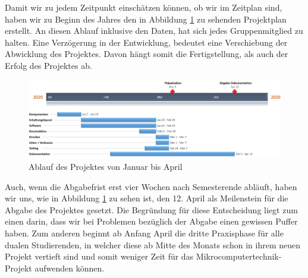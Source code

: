 \label{Arbeitsplan}


Damit wir zu jedem Zeitpunkt einschätzen können, ob wir im Zeitplan sind, haben wir zu Beginn des Jahres den in Abbildung \ref{fig:Ablaufplan} zu sehenden Projektplan erstellt. An diesen Ablauf inklusive den Daten, hat sich jedes Gruppenmitglied zu halten. Eine Verzögerung in der Entwicklung, bedeutet eine Verschiebung der Abwicklung des Projektes. Davon hängt somit die Fertigstellung, als auch der Erfolg des Projektes ab. \\

\begin{figure}[!hbt]
	\centering
	\includegraphics[width=1\linewidth]{Images/Ablaufplan}
	\caption{Ablauf des Projektes von Januar bis April}
	\label{fig:Ablaufplan}
\end{figure}

Auch, wenn die Abgabefrist erst vier Wochen nach Semesterende abläuft, haben wir uns, wie in Abbildung \ref{fig:Ablaufplan} zu sehen ist, den 12. April als Meilenstein für die Abgabe des Projektes gesetzt. Die Begründung für diese Entscheidung liegt zum einen darin, dass wir bei Problemen bezüglich der Abgabe einen gewissen Puffer haben. Zum anderen beginnt ab Anfang April die dritte Praxisphase für alle dualen Studierenden, in welcher diese ab Mitte des Monats schon in ihrem neuen Projekt vertieft sind und somit weniger Zeit für das Mikrocomputertechnik-Projekt aufwenden können.